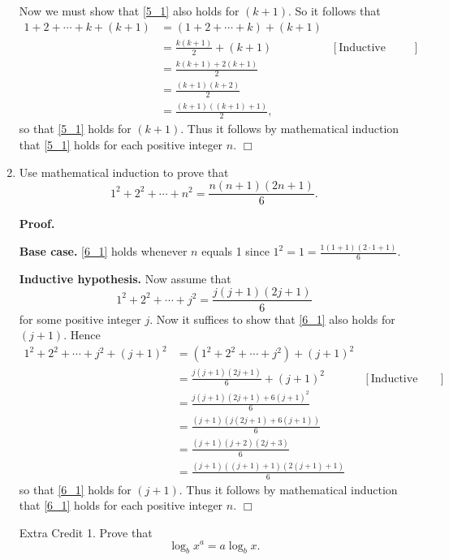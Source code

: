 \documentclass[9pt]{article}
\newcommand{\qed}{\hfill \ensuremath{\Box}}
\newcommand{\D}{\displaystyle}
\begin{document}
\begin{enumerate}
      Now we must show that \eqref{5_1} also holds for $(k+1)$. So it follows
      that
      \begin{align*}
         1 + 2 + \cdots + k + (k+1) &= (1 + 2 + \cdots + k) + (k + 1) \\
            &= \frac{k(k+1)}{2} + (k+1) &[\text{Inductive hypothesis}] \\
            &= \frac{k(k+1)+2(k+1)}{2} \\
            &= \frac{(k+1)(k+2)}{2} \\
            &= \frac{(k+1)((k+1)+1)}{2},
      \end{align*}
      so that \eqref{5_1} holds for $(k+1)$. Thus it follows by mathematical 
      induction that \eqref{5_1} holds for each positive integer $n$. \qed
   \item Use mathematical induction to prove that
         \begin{equation} \label{6_1}
            1^2 + 2^2 + \cdots + n^2 = \frac{n(n+1)(2n+1)}{6}.
         \end{equation}

      \textbf{Proof.} 

      \textbf{Base case.} \eqref{6_1} holds whenever $n$ equals 1 since
      $1^2 = 1 = \D\frac{1(1+1)(2\cdot1+1)}{6}$.

      \textbf{Inductive hypothesis.} Now assume that
      $$1^2 + 2^2 + \cdots + j^2 = \frac{j(j+1)(2j+1)}{6}$$
      for some positive integer $j$. Now it suffices to show that \eqref{6_1} 
      also holds for $(j+1)$. Hence
      \begin{align*}
         1^2 + 2^2 + \cdots + j^2 + (j+1)^2 &=
            (1^2 + 2^2 + \cdots + j^2) + (j + 1)^2 \\
            &= \frac{j(j+1)(2j+1)}{6} + (j + 1)^2
                  &[\text{Inductive hypothesis}] \\
            &= \frac{j(j+1)(2j+1) + 6(j+1)^2}{6} \\
            &= \frac{(j+1)(j(2j+1)+6(j+1))}{6} \\
            &= \frac{(j+1)(j+2)(2j+3)}{6} \\
            &= \frac{(j+1)((j+1)+1)(2(j+1)+1)}{6}
      \end{align*}
      so that \eqref{6_1} holds for $(j+1)$. Thus it follows by mathematical 
      induction that \eqref{6_1} holds for each positive integer $n$. \qed
\item[Extra Credit 1.] Prove that 
   $$\log_bx^a = a \log_bx.$$
   

\end{enumerate}
\end{document}
